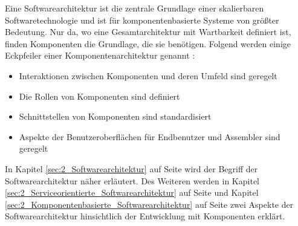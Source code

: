 Eine Softwarearchitektur ist die zentrale Grundlage einer skalierbaren Softwaretechnologie und ist für komponentenbasierte Systeme von größter Bedeutung. Nur da, wo eine Gesamtarchitektur mit Wartbarkeit definiert ist, finden Komponenten die Grundlage, die sie benötigen. Folgend werden einige Eckpfeiler einer Komponentenarchitektur genannt \citereset \autocite{Szyperski.2002}:
\begin{itemize}
\item Interaktionen zwischen Komponenten und deren Umfeld sind geregelt
\item Die Rollen von Komponenten sind definiert
\item Schnittstellen von Komponenten sind standardisiert
\item Aspekte der Benutzeroberflächen für Endbenutzer und Assembler sind geregelt
\end{itemize}
In Kapitel \ref{sec:2_Softwarearchitektur} auf Seite \pageref{sec:2_Softwarearchitektur} wird der Begriff der Softwarearchitektur näher erläutert. Des Weiteren werden in Kapitel \ref{sec:2_Serviceorientierte_Softwarearchitektur} auf Seite \pageref{sec:2_Serviceorientierte_Softwarearchitektur} und Kapitel \ref{sec:2_Komponentenbasierte_Softwarearchitektur} auf Seite \pageref{sec:2_Komponentenbasierte_Softwarearchitektur} zwei Aspekte der Softwarearchitektur hinsichtlich der Entwicklung mit Komponenten erklärt.
